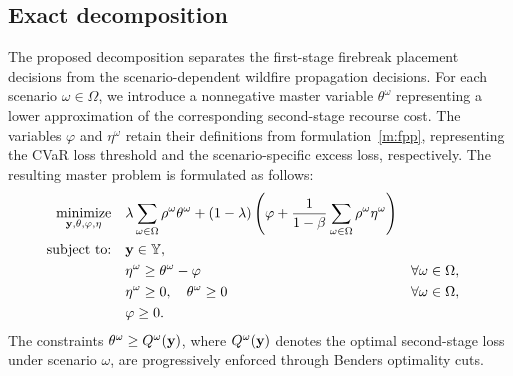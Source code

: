 \documentclass{itor}
\begin{document}
\subsection{Exact decomposition}
\label{subsec:exact_decomposition}

The proposed decomposition separates the first-stage firebreak placement decisions from the scenario-dependent wildfire propagation decisions. For each scenario $\omega \in \Omega$, we introduce a nonnegative master variable $\theta^\omega$ representing a lower approximation of the corresponding second-stage recourse cost. The variables $\varphi$ and $\eta^\omega$ retain their definitions from formulation~\eqref{m:fpp}, representing the CVaR loss threshold and the scenario-specific excess loss, respectively. The resulting master problem is formulated as follows:
%
\begin{equation}
\label{m:fpp_bd}
\begin{aligned}
\underset{\vb{y},\vb{\theta},\varphi,\vb{\eta}}{\text{minimize}}
\quad &
\lambda \sum_{\omega \in \Omega} \rho^\omega \theta^\omega
+ (1-\lambda)
\left(
\varphi + \frac{1}{1-\beta}
\sum_{\omega \in \Omega} \rho^\omega \eta^\omega
\right)\\
\text{subject to:}\quad
& \vb{y} \in \mathbb{Y},\\
& \eta^\omega \geq \theta^\omega - \varphi
&& \forall \omega \in \Omega,\\
& \eta^\omega \geq 0,\quad \theta^\omega \geq 0
&& \forall \omega \in \Omega,\\
& \varphi \geq 0.
\end{aligned}
\end{equation}
%
The constraints $\theta^\omega \geq Q^\omega(\vb{y})$, where $Q^\omega(\vb{y})$ denotes the optimal second-stage loss under scenario $\omega$, are progressively enforced through Benders optimality cuts.
\end{document}
